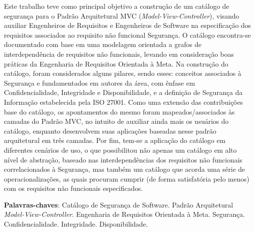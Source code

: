 \begin{resumo}
 Este trabalho teve como principal objetivo a construção de um catálogo de segurança para o Padrão Arquitetural MVC (\textit{Model-View-Controller}), visando auxiliar Engenheiros de Requisitos e Engenheiros de Software na especificação dos requisitos associados ao requisito não funcional Segurança. O catálogo encontra-se documentado com base em uma modelagem orientada a grafos de interdependência de requisitos não funcionais, levando em consideração boas práticas da Engenharia de Requisitos Orientada à Meta. Na construção do catálogo, foram considerados alguns pilares, sendo esses: conceitos associados à Segurança e fundamentados em autores da área, com ênfase em Confidencialidade, Integridade e Disponibilidade, e a definição de Segurança da Informação estabelecida pela ISO 27001. Como uma extensão das contribuições base do catálogo, os apontamentos do mesmo foram mapeados/associados às camadas do Padrão MVC, no intuito de auxiliar ainda mais os usuários do catálogo, enquanto desenvolvem suas aplicações baseadas nesse padrão arquitetural em três camadas. Por fim, tem-se a aplicação do catálogo em diferentes cenários de uso, o que possibilitou não apenas um catálogo em alto nível de abstração, baseado nas interdependências dos requisitos não funcionais correlacionados à Segurança, mas também um catálogo que acorda uma série de operacionalizações, as quais procuram cumprir (de forma satisfatória pelo menos) com os requisitos não funcionais especificados. 

 \vspace{\onelineskip}
    
 \noindent
 \textbf{Palavras-chaves}: Catálogo de Segurança de Software. Padrão Arquitetural \textit{Model-View-Controller}. Engenharia de Requisitos Orientada à Meta. Segurança. Confidencialidade. Integridade. Disponibilidade.
\end{resumo}
